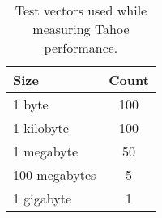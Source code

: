 \begin{table}[h]
  \centering
  \caption{Test vectors used while measuring Tahoe performance.}
  \begin{tabular}{ | l | c | }
    \hline
    \textbf{Size} & \textbf{Count} \\ \hline
    1 byte & 100 \\ \hline
    1 kilobyte & 100 \\ \hline
    1 megabyte & 50 \\ \hline
    100 megabytes & 5 \\ \hline
    1 gigabyte & 1 \\ \hline
  \end{tabular}
  \label{tbl:test_vectors}
\end{table}
